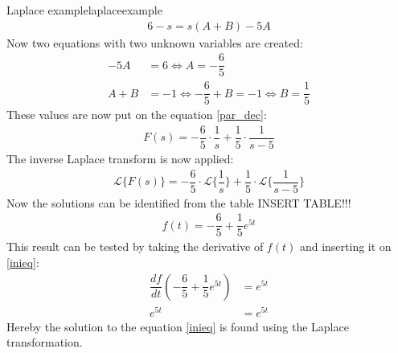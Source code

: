 \begin{example}{Laplace example}{laplaceexample}
\begin{align*}
6 - s = s(A+B) - 5A
\end{align*}
Now two equations with two unknown variables are created:
\begin{align*}
-5A &= 6 \Leftrightarrow A = - \dfrac{6}{5}\\
A + B &= -1 \Leftrightarrow - \dfrac{6}{5} + B = -1 \Leftrightarrow B = \dfrac{1}{5}
\end{align*}
These values are now put on the equation \ref{par_dec}:
\begin{align*}
F(s) =  - \dfrac{6}{5} \cdot \dfrac{1}{s} + \dfrac{1}{5} \cdot \dfrac{1}{s-5}
\end{align*}
The inverse Laplace transform is now applied:
\begin{align*}
\mathcal{L} \{F(s)\} =  - \dfrac{6}{5} \cdot \mathcal{L} \{\dfrac{1}{s}\} + \dfrac{1}{5} \cdot \mathcal{L} \{\dfrac{1}{s-5}\}
\end{align*}
Now the solutions can be identified from the table INSERT TABLE!!!
\begin{align*}
f(t) = - \dfrac{6}{5} + \dfrac{1}{5}e^{5t}
\end{align*}
This result can be tested by taking the derivative of $f(t)$ and inserting it on \ref{inieq}:
\begin{align*}
\dfrac{df}{dt} \left(- \dfrac{6}{5} + \dfrac{1}{5}e^{5t} \right) &= e^{5t} \\
e^{5t} &= e^{5t}
\end{align*}
Hereby the solution to the equation \ref{inieq} is found using the Laplace transformation.
\end{example}